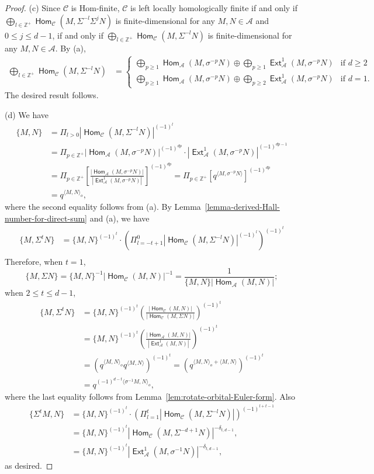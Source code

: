 \documentclass[reqno,12pt,a4paper]{amsart}
\theoremstyle{remark}
\theoremstyle{definition}
\newcommand{\opname}[1]{\operatorname{\mathsf{#1}}}
\newcommand{\Hom}{\opname{Hom}}
\newcommand{\Ext}{\opname{Ext}}
\newcommand{\ca}{{\mathcal A}}
\newcommand{\cc}{{\mathcal C}}
\numberwithin{equation}{section}
\begin{document}
\begin{proof}
(c) Since $\cc$ is Hom-finite, $\cc$ is left locally homologically finite if and only if $\bigoplus_{l\in\mathbb{Z}^+}\Hom_\cc(M,\Sigma^{-l}\Sigma^j N)$ is finite-dimensional for any $M,N\in\ca$ and $0\leq j\leq d-1$, if and only if $\bigoplus_{l\in\mathbb{Z}^+}\Hom_\cc(M,\Sigma^{-l}N)$ is finite-dimensional for any $M,N\in\ca$. By (a),
\begin{align*}
\bigoplus_{l\in\mathbb{Z}^+}\Hom_\cc(M,\Sigma^{-l}N)&=\begin{cases}\bigoplus_{p\geq 1}\Hom_\ca(M,\sigma^{-p}N)\oplus\bigoplus_{p\geq 1}\Ext^1_\ca(M,\sigma^{-p}N) & \text{if }d\geq 2\\
\bigoplus_{p\geq 1}\Hom_\ca(M,\sigma^{-p}N)\oplus\bigoplus_{p\geq 2}\Ext^1_\ca(M,\sigma^{-p}N) & \text{if }d=1.
\end{cases}
\end{align*}
The desired result follows.

(d) We have
\begin{align*}
\{M,N\}&=\Pi_{l>0}|\Hom_\cc(M,\Sigma^{-l}N)|^{(-1)^l}\\
&=\Pi_{p\in\mathbb{Z}^+}|\Hom_\mathcal{A}(M,\sigma^{-p}N)|^{(-1)^{dp}}\cdot|\Ext^1_\mathcal{A}(M,\sigma^{-p}N)|^{(-1)^{dp-1}}\\
&=\Pi_{p\in\mathbb{Z}^+}[\frac{|\Hom_\mathcal{A}(M,\sigma^{-p}N)|}{|\Ext^1_\mathcal{A}(M,\sigma^{-p}N)|}]^{(-1)^{dp}}=\Pi_{p\in\mathbb{Z}^+}[q^{\langle M,\sigma^{-p}N \rangle}]^{(-1)^{dp}}\\
&=q^{\langle M,N\rangle_o},
\end{align*}
where the second equality follows from (a). By Lemma~\ref{lemma-derived-Hall-number-for-direct-sum} and (a), we have
\begin{align*}
\{M,\Sigma^t N\}&=\{M,N\}^{(-1)^t}\cdot(\Pi_{l=-t+1}^0|\Hom_\cc(M,\Sigma^{-l}N)|^{(-1)^l})^{(-1)^t}\\
\end{align*}
Therefore, when $t=1$,
\[
\{M,\Sigma N\}=\{M,N\}^{-1}|\Hom_\cc(M,N)|^{-1}=\frac{1}{\{M,N\}|\Hom_\ca(M,N)|};
\]
when $2\leq t\leq d-1$,
\begin{align*}
\{M,\Sigma^t N\}&=\{M,N\}^{(-1)^t}(\frac{|\Hom_\cc(M,N)|}{|\Hom_\cc(M,\Sigma N)|})^{(-1)^t}\\
&=\{M,N\}^{(-1)^t}(\frac{|\Hom_\ca(M,N)|}{|\Ext^1_\ca(M,N)|})^{(-1)^t}\\
&=(q^{\langle M,N\rangle_o}q^{\langle M,N\rangle})^{(-1)^t}=(q^{\langle M,N\rangle_o+\langle M,N\rangle})^{(-1)^t}\\
&=q^{(-1)^{d-t}\langle\sigma^{-1}M,N\rangle_o},
\end{align*}
where the last equality follows from Lemma~\ref{lem:rotate-orbital-Euler-form}. Also
\begin{align*}
\{\Sigma^t M,N\}&=\{M,N\}^{(-1)^t}\cdot (\Pi_{l=1}^t |\Hom_\cc(M,\Sigma^{-l}N)|)^{(-1)^{l+t-1}}\\
&=\{M,N\}^{(-1)^t}|\Hom_\cc(M,\Sigma^{-d+1}N)|^{-\delta_{t,d-1}},\\
&=\{M,N\}^{(-1)^t}|\Ext^1_\ca(M,\sigma^{-1}N)|^{-\delta_{t,d-1}},
\end{align*}
as desired.
\end{proof}
\end{document}

